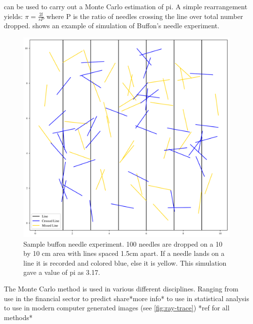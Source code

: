  can be used to carry out a Monte Carlo estimation of pi. A simple rearrangement yields: $\pi = \tfrac{2l}{sP}$ where P is the ratio of needles crossing the line over total number dropped.  shows an example of simulation of Buffon's needle experiment.\\

\begin{figure}
\centering
\includegraphics[width=\columnwidth/2]{./MCRT/images/buffon-pi=317.pdf}
\caption{Sample buffon needle experiment. 100 needles are dropped on a 10 by 10 cm area with lines spaced 1.5cm apart. If a needle lands on a line it is recorded and colored blue, else it is yellow. This simulation gave a value of pi as 3.17.}
\label{fig:buffon-needle}
\end{figure}

The Monte Carlo method is used in various different disciplines. Ranging from use in the financial sector to predict share*more info* to use in statistical analysis to use in modern computer generated images (see \cref{fig:ray-trace}) *ref for all methods*

